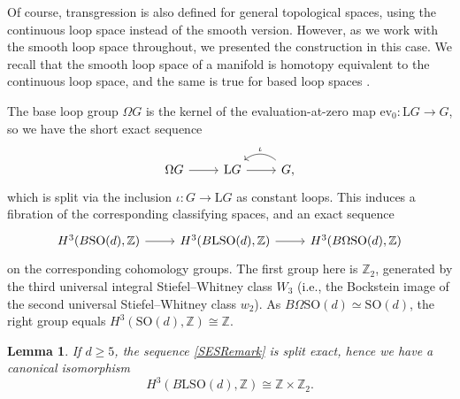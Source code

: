 \documentclass[pdftex]{sigma}
\numberwithin{equation}{section}
\newtheorem{Lemma}[Theorem]{Lemma}
\newcommand{\Z}{\mathbb{Z}}
\newcommand{\SO}{\mathrm{SO}}
\renewcommand{\L}{\mathrm{L}}
\begin{document}
\begin{Remark}
Of course, transgression is also defined for general topological spaces, using the continuous loop space instead of the smooth version.
However, as we work with the smooth loop space throughout, we presented the construction in this case.
We recall that the smooth loop space of a manifold is homotopy equivalent to the continuous loop space, and the same is true for based loop spaces \cite[Proposition~7.1]{CareyCrowleyMurray}.
\end{Remark}



The base loop group $\Omega G$ is the kernel of the evaluation-at-zero map $\mathrm{ev}_0\colon \L G \to G$, so we have the short exact sequence
\begin{equation} \label{PathSequence}
 \begin{tikzcd}
 \Omega G \ar[r] & \L G \ar[r] & G \ar[l, bend right=40, "\iota"'],
\end{tikzcd}
\end{equation}
which is split via the inclusion $\iota\colon G \to \L G$ as constant loops.
This induces a fibration of the corresponding classifying spaces, and an exact sequence
\begin{equation} \label{SESRemark}
\begin{tikzcd}
H^3(B\SO(d), \Z) \ar[r] & H^3(B\L\SO(d), \Z) \ar[r] & H^3(B\Omega\SO(d), \Z)
\end{tikzcd}
\end{equation}
on the corresponding cohomology groups.
The first group here is $\Z_2$, generated by the third universal integral Stiefel--Whitney class $W_3$ (i.e., the Bockstein image of the second universal Stiefel--Whitney class $w_2$).
As $B\Omega\SO(d) \simeq \SO(d)$, the right group equals $H^3(\SO(d), \Z) \cong \Z$.

\begin{Lemma} \label{LemmaH3BLSOZ}
If $d \geq 5$, the sequence \eqref{SESRemark} is split exact, hence we have a canonical isomorphism
\begin{equation*}
 H^3(B\L\SO(d), \Z) \cong \Z \times \Z_2.
\end{equation*}
\end{Lemma}
\end{document}
